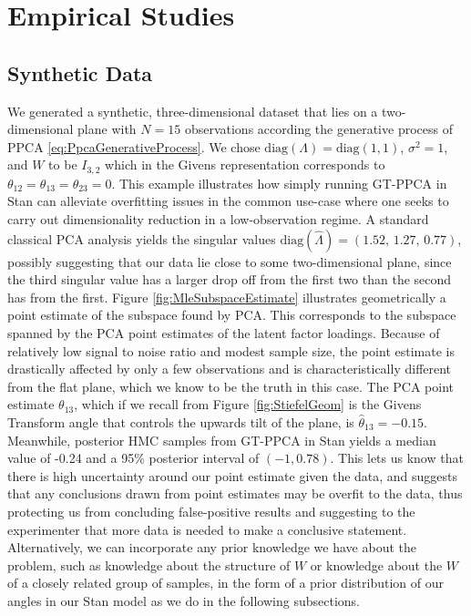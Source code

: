 \documentclass{article}
\begin{document}
\section{Empirical Studies}

\subsection{Synthetic Data}
We generated a synthetic, three-dimensional dataset that lies on a two-dimensional plane with $N =15$ observations according the generative process of PPCA \ref{eq:PpcaGenerativeProcess}. We chose $\mathrm{diag}(\Lambda) =\mathrm{diag}(1, 1)$, $\sigma^2 = 1$, and $W$ to be $I_{3,2}$ which in the Givens representation corresponds to $\theta_{12} = \theta_{13} = \theta_{23} = 0$. This example illustrates how simply running GT-PPCA in Stan can alleviate overfitting issues in the common use-case where one seeks to carry out dimensionality reduction in a low-observation regime. A standard classical PCA analysis yields the singular values $\mathrm{diag}(\hat{\Lambda}) = (1.52,\, 1.27,\, 0.77)$,  possibly suggesting that our data lie close to some two-dimensional plane, since the third singular value has a larger drop off from the first two than the second has from the first. Figure \ref{fig:MleSubspaceEstimate} illustrates geometrically a point estimate of the subspace found by PCA. This corresponds to the subspace spanned by the PCA point estimates of the latent factor loadings. Because of relatively low signal to noise ratio and modest sample size, the point estimate is drastically affected by only a few observations and is characteristically different from the flat plane, which we know to be the truth in this case. The PCA point estimate $\theta_{13}$, which if we recall from Figure \ref{fig:StiefelGeom} is the Givens Transform angle that controls the upwards tilt of the plane, is $\hat{\theta}_{13} = -0.15$. Meanwhile, posterior HMC samples from GT-PPCA in Stan yields a median value of -0.24 and a 95\% posterior interval of $(-1, 0.78)$. This lets us know that there is high uncertainty around our point estimate given the data, and suggests that any conclusions drawn from point estimates may be overfit to the data, thus protecting us from concluding false-positive results and suggesting to the experimenter that more data is needed to make a conclusive statement. Alternatively, we can incorporate any prior knowledge we have about the problem, such as knowledge about the structure of $W$ or knowledge about the $W$ of a closely related group of samples, in the form of a prior distribution of our angles in our Stan model as we do in the following subsections.
\end{document}
